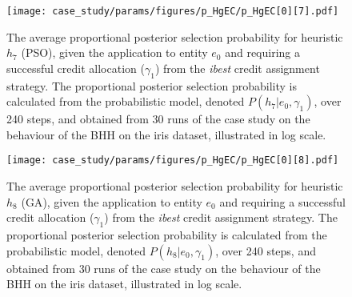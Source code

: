 \begin{figure}[htpb]
	\centering
	\texttt{[image: case\_study/params/figures/p\_HgEC/p\_HgEC[0][7].pdf]}
	\caption{The average proportional posterior selection probability for heuristic $h_{7}$ (\acs{PSO}), given the application to entity $e_{0}$ and requiring a successful credit allocation ($\gamma_{1}$) from the \textit{ibest} credit assignment strategy. The proportional posterior selection probability is calculated from the probabilistic model, denoted $P(h_{7} \vert e_{0}, \gamma_{1})$, over 240 steps, and obtained from 30 runs of the case study on the behaviour of the \acs{BHH} on the iris dataset, illustrated in log scale.}
	\label{fig:results:case_study:p_HgEC:0:7}
\end{figure}

\begin{figure}[htpb]
	\centering
	\texttt{[image: case\_study/params/figures/p\_HgEC/p\_HgEC[0][8].pdf]}
	\caption{The average proportional posterior selection probability for heuristic $h_{8}$ (\acs{GA}), given the application to entity $e_{0}$ and requiring a successful credit allocation ($\gamma_{1}$) from the \textit{ibest} credit assignment strategy. The proportional posterior selection probability is calculated from the probabilistic model, denoted $P(h_{8} \vert e_{0}, \gamma_{1})$, over 240 steps, and obtained from 30 runs of the case study on the behaviour of the \acs{BHH} on the iris dataset, illustrated in log scale.}
	\label{fig:results:case_study:p_HgEC:0:8}
\end{figure}


